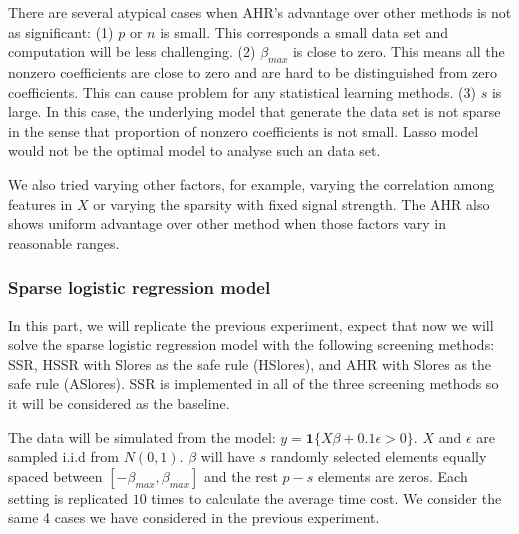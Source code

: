 There are several atypical cases when AHR's advantage over other methods is not as significant: (1) $p$ or $n$ is small. This corresponds a small data set and computation will be less challenging. (2) $\beta_{max}$ is close to zero. This means all the nonzero coefficients are close to zero and are hard to be distinguished from zero coefficients. This can cause problem for any statistical learning methods. (3) $s$ is large. In this case, the underlying model that generate the data set is not sparse in the sense that proportion of nonzero coefficients is not small. Lasso model would not be the optimal model to analyse such an data set.

We also tried varying other factors, for example, varying the correlation among features in $X$ or varying the sparsity with fixed signal strength. The AHR also shows uniform advantage over other method when those factors vary in reasonable ranges.

\subsubsection{Sparse logistic regression model}

In this part, we will replicate the previous experiment, expect that now we will solve the sparse logistic regression model with the following screening methods: SSR, HSSR with Slores as the safe rule (HSlores), and AHR with Slores as the safe rule (ASlores). SSR is implemented in all of the three screening methods so it will be considered as the baseline.

The data will be simulated from the model: $y=\mathbf{1}\{X\beta+0.1\epsilon >0\}$. $X$ and $\epsilon$ are sampled i.i.d from $N(0,1)$. $\beta$ will have $s$ randomly selected elements equally spaced between $[-\beta_{max},\beta_{max}]$ and the rest $p-s$ elements are zeros. Each setting is replicated $10$ times to calculate the average time cost. We consider the same 4 cases we have considered in the previous experiment.

